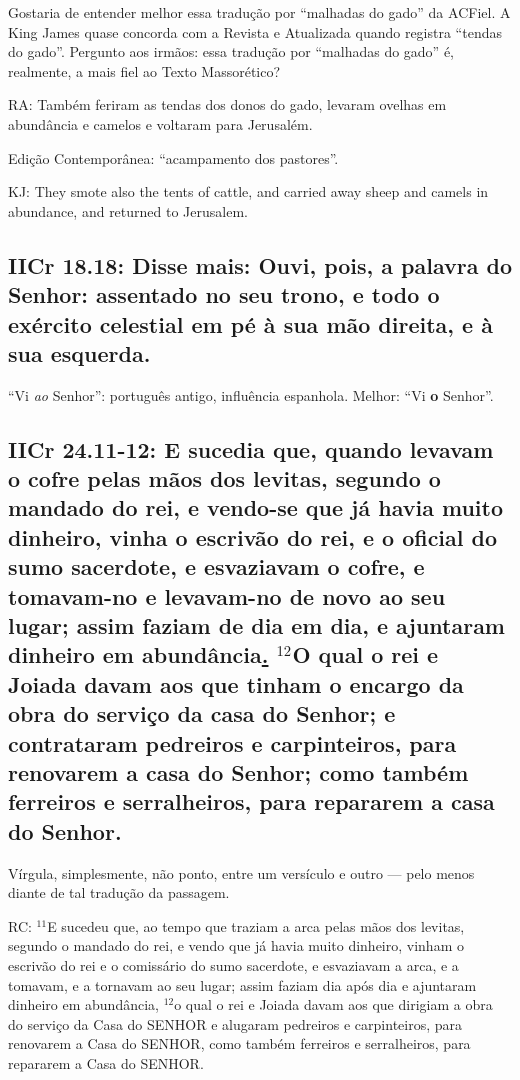 Gostaria de entender melhor essa tradução por ``malhadas do gado'' da
ACFiel. A King James quase concorda com a Revista e Atualizada quando
registra ``tendas do gado''. Pergunto aos irmãos: essa tradução por
``malhadas do gado'' é, realmente, a mais fiel ao Texto Massorético?

RA: Também feriram as tendas dos donos do gado, levaram ovelhas em abundância e camelos e voltaram para Jerusalém.

Edição Contemporânea: ``acampamento dos pastores''.

KJ: They smote also the tents of cattle, and carried away sheep and camels in abundance, and returned to Jerusalem.

\subsection{IICr 18.18: Disse mais: Ouvi, pois, a palavra do Senhor:
   assentado no seu trono, e todo o exército
  celestial em pé à sua mão direita, e à sua esquerda.}
``Vi \emph{ao} Senhor'': português antigo, influência
  espanhola. Melhor: ``Vi \textbf{o} Senhor''.

\subsection{IICr 24.11-12: E sucedia que, quando levavam o cofre pelas mãos dos levitas, segundo o mandado do rei, e vendo-se que já havia muito dinheiro, vinha o escrivão do rei, e o oficial do sumo sacerdote, e esvaziavam o cofre, e tomavam-no e levavam-no de novo ao seu lugar; assim faziam de dia em dia, e ajuntaram dinheiro em abundância\uline{.} $^{\mathrm{12}}$O qual o rei e Joiada davam aos que tinham o encargo da obra do serviço da casa do Senhor; e contrataram pedreiros e carpinteiros, para renovarem a casa do Senhor; como também ferreiros e serralheiros, para repararem a casa do Senhor.}
Vírgula, simplesmente, não ponto, entre um versículo e outro --- pelo menos diante de tal tradução da passagem.

RC: $^{\mathrm{11}}$E sucedeu que, ao tempo que traziam a arca pelas
mãos dos levitas, segundo o mandado do rei, e vendo que já havia muito
dinheiro, vinham o escrivão do rei e o comissário do sumo sacerdote, e
esvaziavam a arca, e a tomavam, e a tornavam ao seu lugar; assim
faziam dia após dia e ajuntaram dinheiro em abundância,
$^{\mathrm{12}}$o qual o rei e Joiada davam aos que dirigiam a obra do
serviço da Casa do SENHOR e alugaram pedreiros e carpinteiros, para
renovarem a Casa do SENHOR, como também ferreiros e serralheiros, para
repararem a Casa do SENHOR.

